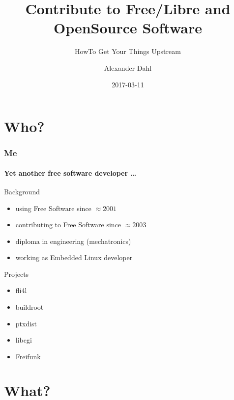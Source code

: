 \documentclass{beamer}
\title[Contrib To FLOSS]{Contribute to Free/Libre and OpenSource Software}
\subtitle{HowTo Get Your Things Upstream}
\author{Alexander Dahl}
\institute[lespocky.de]{\url{http://www.lespocky.de/}}
\date{2017-03-11}
\begin{document}
\begin{frame}
    \titlepage
\end{frame}

\begin{frame}
    \tableofcontents
\end{frame}


\section*{Who?}

\begin{frame}
    \frametitle{Me}
    \framesubtitle{Yet another free software developer \dots}

    \begin{block}{Background}
        \begin{itemize}
            \item using Free Software since $\approx 2001$
            \item contributing to Free Software since $\approx 2003$
            \item diploma in engineering (mechatronics)
            \item working as Embedded Linux developer
        \end{itemize}
    \end{block}

    \pause

    \begin{block}{Projects}
        \begin{itemize}
            \item fli4l
            \item buildroot
            \item ptxdist
            \item libcgi
            \item Freifunk
        \end{itemize}
    \end{block}
\end{frame}


\section{What?}

\frame{\tableofcontents[currentsection]}
\end{document}
